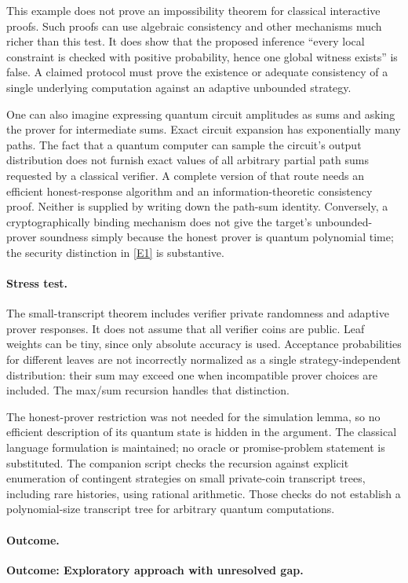 \documentclass[11pt,a4paper]{article}
\newcommand{\eref}[2]{\hyperlink{extra:#1:#2}{[E#2]}}
\numberwithin{equation}{section}
\begin{document}
This example does not prove an impossibility theorem for classical
interactive proofs.  Such proofs can use algebraic consistency and
other mechanisms much richer than this test.  It does show that the
proposed inference ``every local constraint is checked with positive
probability, hence one global witness exists'' is false.  A claimed
protocol must prove the existence or adequate consistency of a single
underlying computation against an adaptive unbounded strategy.

One can also imagine expressing quantum circuit amplitudes as sums
and asking the prover for intermediate sums.  Exact circuit expansion
has exponentially many paths.  The fact that a quantum computer can
sample the circuit's output distribution does not furnish exact values
of all arbitrary partial path sums requested by a classical verifier.
A complete version of that route needs an efficient honest-response
algorithm and an information-theoretic consistency proof.  Neither
is supplied by writing down the path-sum identity.  Conversely, a
cryptographically binding mechanism does not give the target's
unbounded-prover soundness simply because the honest prover is quantum
polynomial time; the security distinction in \eref{statement}{1} is substantive.

\paragraph{Stress test.}
The small-transcript theorem includes verifier private randomness and
adaptive prover responses.  It does not assume that all verifier coins
are public.  Leaf weights can be tiny, since only absolute accuracy is
used.  Acceptance probabilities for different leaves are not incorrectly
normalized as a single strategy-independent distribution: their sum
may exceed one when incompatible prover choices are included.  The
max/sum recursion handles that distinction.

The honest-prover restriction was not needed for the simulation lemma,
so no efficient description of its quantum state is hidden in the
argument.  The classical language formulation is maintained; no
oracle or promise-problem statement is substituted.  The companion
script checks the recursion against explicit enumeration of contingent
strategies on small private-coin transcript trees, including rare
histories, using rational arithmetic.  Those checks do not establish a
polynomial-size transcript tree for arbitrary quantum computations.

\paragraph{Outcome.}
\textbf{Outcome: Exploratory approach with unresolved gap.}
\end{document}
